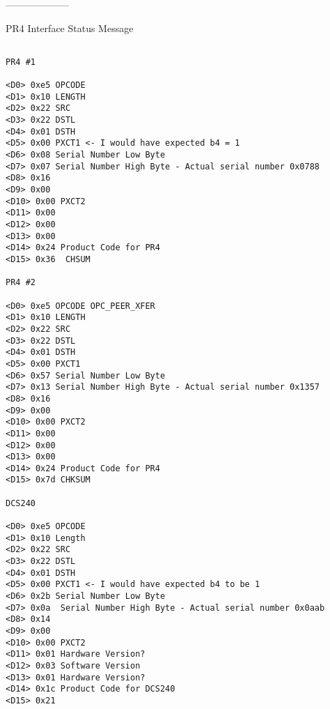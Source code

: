 

















































--------------------

PR4 Interface Status Message

\begin{verbatim}

PR4 #1

<D0> 0xe5 OPCODE
<D1> 0x10 LENGTH
<D2> 0x22 SRC
<D3> 0x22 DSTL
<D4> 0x01 DSTH
<D5> 0x00 PXCT1 <- I would have expected b4 = 1
<D6> 0x08 Serial Number Low Byte
<D7> 0x07 Serial Number High Byte - Actual serial number 0x0788
<D8> 0x16 
<D9> 0x00 
<D10> 0x00 PXCT2
<D11> 0x00 
<D12> 0x00 
<D13> 0x00 
<D14> 0x24 Product Code for PR4
<D15> 0x36  CHSUM

PR4 #2

<D0> 0xe5 OPCODE OPC_PEER_XFER
<D1> 0x10 LENGTH
<D2> 0x22 SRC
<D3> 0x22 DSTL
<D4> 0x01 DSTH
<D5> 0x00 PXCT1 
<D6> 0x57 Serial Number Low Byte
<D7> 0x13 Serial Number High Byte - Actual serial number 0x1357
<D8> 0x16 
<D9> 0x00 
<D10> 0x00 PXCT2
<D11> 0x00 
<D12> 0x00 
<D13> 0x00 
<D14> 0x24 Product Code for PR4
<D15> 0x7d CHKSUM

DCS240

<D0> 0xe5 OPCODE
<D1> 0x10 Length
<D2> 0x22 SRC
<D3> 0x22 DSTL
<D4> 0x01 DSTH
<D5> 0x00 PXCT1 <- I would have expected b4 to be 1
<D6> 0x2b Serial Number Low Byte
<D7> 0x0a  Serial Number High Byte - Actual serial number 0x0aab
<D8> 0x14 
<D9> 0x00 
<D10> 0x00 PXCT2
<D11> 0x01 Hardware Version?
<D12> 0x03 Software Version
<D13> 0x01 Hardware Version?
<D14> 0x1c Product Code for DCS240
<D15> 0x21

\end{verbatim}
